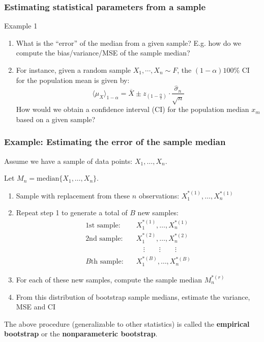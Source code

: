 \documentclass[smaller]{beamer}
\newcommand{\lt}{\left}
\newcommand{\rt}{\right}
\newcommand{\?}{\stackrel{?}{=}}
\newcommand{\fr}{\frac}
\newcommand{\ol}{\overline}
\newcommand{\rd}{\color{red}}
\begin{document}
\begin{frame}
  \frametitle{Estimating statistical parameters from a sample}
  \pause
  \begin{exampleblock}{Example 1}
    \begin{enumerate}[<+->]
    \item What is the ``error'' of the median from a given sample? \pause E.g. how do we compute the bias/variance/MSE of the sample median?
    \item For instance, given a random sample $X_1, \cdots, X_n \sim F$, the $(1-\alpha)100\%$ CI for the population mean is given by:\pause
      \begin{equation}
        \label{eq:11}
        \langle \mu_X \rangle_{1-\alpha} =  \ol{X} \pm z_{\lt(1-\fr\alpha2\rt)}\cdot\fr{\hat\sigma_n}{\sqrt{n}}
      \end{equation} \pause
      How would we obtain a confidence interval (CI) for the population median $x_m$ based on a given sample? 
    \end{enumerate}
  \end{exampleblock}
\end{frame}



\begin{frame}
  \frametitle{Example: Estimating the error of the sample median}
  \pause

  Assume we have a sample of data points: $X_1, \ldots, X_n$. \\ \pause

  Let $M_n = \text{median}\{X_1,\ldots,X_n\}$. \\\pause

  \begin{enumerate}[<+->]
  \item Sample with replacement from these $n$ observations: $X_1^{*(1)}, \ldots, X_n^{*(1)}$
  \item Repeat step 1 to generate a total of $B$ new samples:
        \begin{align*}
        \text{1st sample:} \quad&  X_1^{*(1)}, \ldots, X_n^{*(1)} \\
        \text{2nd sample:} \quad&  X_1^{*(2)}, \ldots, X_n^{*(2)} \\
        \phantom{\text{1st sample:} } \quad&  \quad \vdots \qquad \vdots \qquad \vdots \\
        \text{$B$th sample:} \quad &  X_1^{*(B)}, \ldots, X_n^{*(B)} 
        \end{align*}
  \item For each of these new samples, compute the sample median $M_n^{*(r)}$
  \item From this distribution of bootstrap sample medians, estimate the variance, MSE and CI
  \end{enumerate}
\pause
  The above procedure (generalizable to other statistics) is called the \textbf{\rd empirical bootstrap} or the
  \textbf{\rd nonparameteric bootstrap}.
\end{frame}
\end{document}
